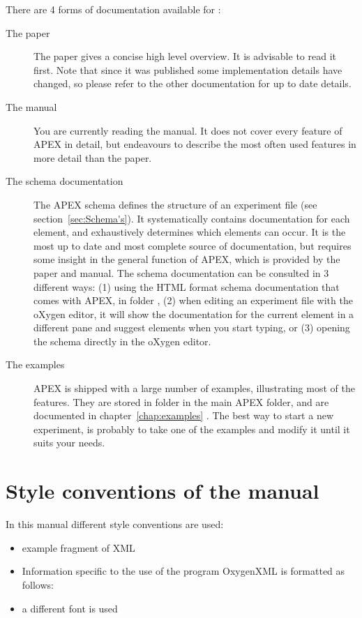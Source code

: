 There are 4 forms of documentation available for \apex: 

\begin{description}
\item[The paper] The \apex paper gives a concise high level overview. It is advisable to read it first. Note that since it was published some implementation details have changed, so please refer to the other documentation for up to date details.
\item[The manual] You are currently reading the manual. It does not cover every feature of APEX in detail, but endeavours to describe the most often used features in more detail than the paper.
\item[The schema documentation] The APEX schema defines the structure of an experiment file (see section~\ref{sec:Schema's}). It systematically contains documentation for each element, and exhaustively determines which elements can occur. It is the most up to date and most complete source of documentation, but requires some insight in the general function of APEX, which is provided by the paper and manual. The schema documentation can be consulted in 3 different ways: (1) using the HTML format schema documentation that comes with APEX, in folder  , (2) when editing an experiment file with the oXygen editor, it will show the documentation for the current element in a different pane and suggest elements when you start typing, or (3) opening the schema  directly in the oXygen editor.
\item[The examples] APEX is shipped with a large number of examples, illustrating most of the features. They are stored in folder  in the main APEX folder, and are documented in chapter~\ref{chap:examples} . The best way to start a new experiment, is probably to take one of the examples and modify it until it suits your needs.
\end{description}


\section{Style conventions of the manual}
In this manual different style conventions are used:
\begin{itemize}
\item {} example fragment of XML

\item Information specific to the use of the program OxygenXML is
formatted as follows: 

\item a different font is used 
\end{itemize}

